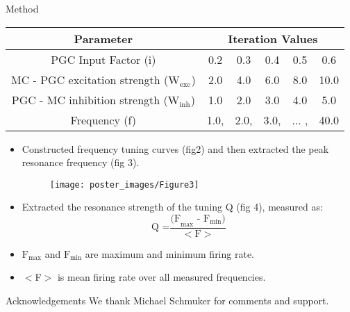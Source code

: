 \documentclass[final,hyperref={pdfpagelabels=false}]{beamer}
\begin{document}
\begin{frame}{}
\begin{columns}[t]
\begin{column}{.48\linewidth}
\begin{block}{Method}
\begin{center}
\begin{tabular}{ |c| c c c c c | }
\hline 
Parameter & \multicolumn{5}{c|}{Iteration Values}\\
\hline
PGC Input Factor (i) & 0.2 & 0.3 & 0.4 & 0.5 & 0.6 \\ 
\hline
\multirow{2}{12em}{\centering MC - PGC excitation strength (\mbox{$\text{W}_{\text{exc}}$})} & \multirow{2}{*}{2.0} & \multirow{2}{*}{4.0} & \multirow{2}{*}{6.0} & \multirow{2}{*}{8.0} & \multirow{2}{*}{10.0}  \\
\multirow{2}{*}{} & \multirow{2}{*}{} & \multirow{2}{*}{} & \multirow{2}{*}{} & \multirow{2}{*}{} & \multirow{2}{*}{}\\
\hline
\multirow{2}{12em}{\centering PGC - MC inhibition strength (\mbox{$\text{W}_{\text{inh}}$})} & \multirow{2}{*}{1.0} & \multirow{2}{*}{2.0} & \multirow{2}{*}{3.0} & \multirow{2}{*}{4.0} & \multirow{2}{*}{5.0} \\
\multirow{2}{*}{} & \multirow{2}{*}{} & \multirow{2}{*}{} & \multirow{2}{*}{} & \multirow{2}{*}{} & \multirow{2}{*}{}\\
\hline
Frequency (f) & 1.0, & 2.0, & 3.0, & ... , & 40.0\\
\hline
\end{tabular}
\end{center}

\begin{itemize}
\item Constructed frequency tuning curves (fig2) and then extracted the peak resonance frequency (fig 3).

\begin{figure}
\center
\texttt{[image: poster\_images/Figure3]}
\end{figure}

\item Extracted the resonance strength of the tuning Q (fig 4), measured as:
\[
\text{Q =} \frac{\text{(F}_{\text{max}} \text{ - F}_{\text{min}}\text{)}}{<\text{F}>}
\]
\item \mbox{$\text{F}_{\text{max}}$} and \mbox{$\text{F}_{\text{min}}$} are maximum and minimum firing rate.
\item $<$F$>$ is mean firing rate over all measured frequencies.
\end{itemize}
\end{block}

\begin{block}{Acknowledgements} 
We thank Michael Schmuker for comments and support.
\end{block}


\end{column}
\end{columns}
\end{frame}
\end{document}

